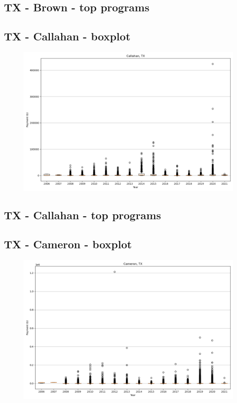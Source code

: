 \subsection*{TX - Brown - top programs}

\newpage
\subsection*{TX - Callahan - boxplot}
\begin{figure}[h]
\centering
\includegraphics[width=7in]{../output/boxplots/counties/Callahan-TX_boxplot.png}
\end{figure}


\subsection*{TX - Callahan - top programs}

\newpage
\subsection*{TX - Cameron - boxplot}
\begin{figure}[h]
\centering
\includegraphics[width=7in]{../output/boxplots/counties/Cameron-TX_boxplot.png}
\end{figure}


